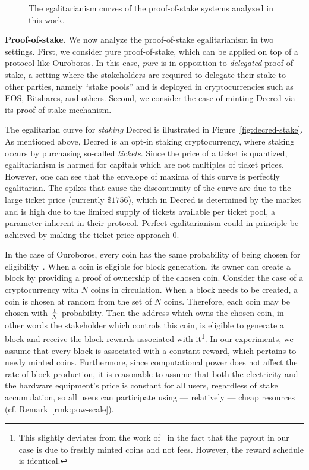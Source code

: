 \begin{figure}
  \caption{The egalitarianism curves of the proof-of-stake systems analyzed in this work.}
  \label{fig:egalitarian_curves_pos}
\end{figure}

\noindent\textbf{Proof-of-stake.}
\noindent
We now analyze the proof-of-stake egalitarianism in two settings. First, we
consider pure proof-of-stake, which can be applied on top of a protocol like
Ouroboros. In this case, \emph{pure} is in opposition to \emph{delegated}
proof-of-stake, a setting where the stakeholders are required to delegate their
stake to other parties, namely ``stake pools'' and is deployed in
cryptocurrencies such as EOS, Bitshares, and others. Second, we consider the
case of minting Decred via its proof-of-stake mechanism.

The egalitarian curve for \emph{staking} Decred is illustrated in
Figure~\ref{fig:decred-stake}.
As mentioned above, Decred is an opt-in staking cryptocurrency, where staking
occurs by purchasing so-called \emph{tickets}. Since the price of a ticket is
quantized, egalitarianism is harmed for capitals which are not multiples of
ticket prices. However, one can see that the envelope of maxima of this curve
is perfectly egalitarian. The spikes that cause the discontinuity of the curve
are due to the large ticket price (currently $\$1756$), which in Decred is
determined by the market and is high due to the limited supply of tickets
available per ticket pool, a parameter inherent in their protocol. Perfect
egalitarianism could in principle be achieved by making the ticket price
approach $0$.

In the case of Ouroboros, every coin has the same probability of
being chosen for eligibility~\cite{C:KRDO17}. When a coin is eligible for block
generation, its owner can create a block by providing a proof of ownership of
the chosen coin. Consider the case of a cryptocurrency with $N$ coins in
circulation. When a block needs to be created, a coin is chosen at random from
the set of $N$ coins. Therefore, each coin may be chosen with $1 \over N$
probability. Then the address which owns the chosen coin, in other words the
stakeholder which controls this coin, is eligible to generate a block and
receive the block rewards associated with it\footnote{This slightly deviates
from the work of~\cite{C:KRDO17} in the fact that the payout in our case is due
to freshly minted coins and not fees. However, the reward schedule is
identical.}. In our experiments, we assume that every block is associated with a
constant reward, which pertains to newly minted coins. Furthermore, since
computational power does not affect the rate of block production, it is
reasonable to assume that both the electricity and the hardware equipment's
price is constant for all users, regardless of stake accumulation, so all users
can participate using --- relatively --- cheap resources (cf. Remark~\ref{rmk:pow-scale}).

